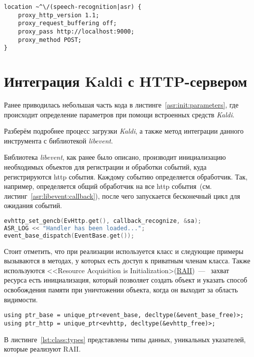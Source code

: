 \begin{lstlisting}[caption={Пример конфигурации Nginx},label={nginx:conf}]
location ~^\/(speech-recognition|asr) {
    proxy_http_version 1.1;
    proxy_request_buffering off;
    proxy_pass http://localhost:9000;
    proxy_method POST;
}

\end{lstlisting}

\section{Интеграция Kaldi с HTTP-сервером}
Ранее приводилась небольшая часть кода в листинге~\ref{asr:init:parameters}, где
происходит определение параметров при помощи встроенных средств \textit{Kaldi}.

Разберём подробнее процесс загрузки \textit{Kaldi}, а также метод интеграции
данного инструмента с библиотекой \textit{libevent}.

Библиотека \textit{libevent}, как ранее было описано, производит инициализацию
необходимых объектов для регистрации и обработки событий, куда регистрируются
http события. Каждому событию определяется обработчик. Так, например, определяется
общий обработчик на все http события~(см. листинг~\ref{asr:libevent:callback}),
после чего запускается бесконечный цикл для ожидания событий.

\begin{lstlisting}[caption={Создание обработчика событий},label=asr:libevent:callback,language=C++]
evhttp_set_gencb(EvHttp.get(), callback_recognize, &sa);
ASR_LOG << "Handler has been loaded...";
event_base_dispatch(EventBase.get());
\end{lstlisting}

Стоит отметить, что при реализации используется класс и следующие примеры вызываются
в методах, у которых есть доступ к приватным членам класса. Также используются
<<Resource Acquisition is Initialization>(\hyperlink{raii}{RAII})~---~
захват ресурса есть инициализация, который позволяет создать объект и указать
способ освобождения памяти при уничтожении объекта, когда он выходит за область
видимости.

\begin{lstlisting}[caption={Описание некоторых типов данных}, label={lst:class:types}]
using ptr_base = unique_ptr<event_base, decltype(&event_base_free)>;
using ptr_http = unique_ptr<evhttp, decltype(&evhttp_free)>;
\end{lstlisting}

В листинге~\ref{lst:class:types} представлены типы данных, уникальных указателей,
которые реализуют RAII.

